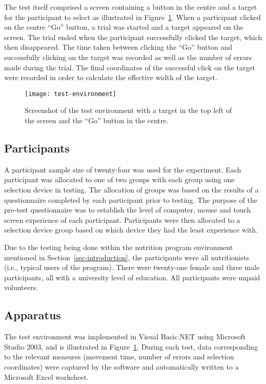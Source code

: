 \documentclass[a4paper]{article}
\begin{document}
The test itself comprised a screen containing a button in the centre and
a target for the participant to select as illustrated in
Figure~\ref{fig-test-environment}. When a participant clicked on the
centre ``Go'' button, a trial was started and a target appeared on the
screen. The trial ended when the participant successfully clicked the
target, which then disappeared. The time taken between clicking the
``Go'' button and successfully clicking on the target was recorded as
well as the number of errors made during the trial. The final
coordinates of the successful click on the target were recorded in order
to calculate the effective width of the target.


\begin{figure}
	\centering
 	\texttt{[image: test-environment]}
	\caption{Screenshot of the test environment with a target in the
	top left of the screen and the ``Go'' button in the centre.}
	\label{fig-test-environment}
\end{figure}


\subsection{Participants}
\label{sec-method-participants}

A participant sample size of twenty-four was used for the experiment.
Each participant was allocated to one of two groups with each group
using one selection device in testing. The allocation of groups was
based on the results of a questionnaire completed by each participant
prior to testing. The purpose of the pre-test questionnaire was to
establish the level of computer, mouse and touch screen experience of
each participant. Participants were then allocated to a selection device
group based on which device they had the least experience with.

Due to the testing being done within the nutrition program environment
mentioned in Section~\ref{sec-introduction}, the participants were all
nutritionists (i.e., typical users of the program). There were
twenty-one female and three male participants, all with a university
level of education. All participants were unpaid volunteers.


\subsection{Apparatus}
\label{sec-method-apparatus}

The test environment was implemented in Visual Basic.NET using Microsoft
Studio 2003, and is illustrated in Figure~\ref{fig-test-environment}.
During each test, data corresponding to the relevant measures (movement
time, number of errors and selection coordinates) were captured by the
software and automatically written to a Microsoft Excel worksheet.
\end{document}
